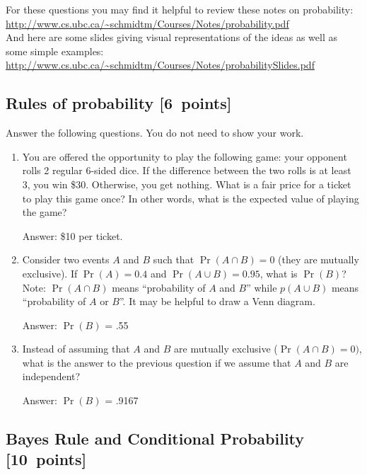 \documentclass{article}
\newcommand{\blu}[1]{{\textcolor{blu}{#1}}}
\newenvironment{answer}{\par\begingroup\color{gre}Answer: }{\endgroup}
\let\ask\blu
\newcommand\pts[1]{\textcolor{pointscolour}{[#1~points]}}
\begin{document}
  For these questions you may find it helpful to review these notes on probability:\\
  \url{http://www.cs.ubc.ca/~schmidtm/Courses/Notes/probability.pdf}\\
  And here are some slides giving visual representations of the ideas as well as some simple examples:\\
  \url{http://www.cs.ubc.ca/~schmidtm/Courses/Notes/probabilitySlides.pdf}

  \subsection{Rules of probability \pts{6}}

  \ask{Answer the following questions.} You do not need to show your work.

  \begin{enumerate}
  \item You are offered the opportunity to play the following game: your opponent rolls 2 regular 6-sided dice. If the difference between the two rolls is at least 3, you win \$30. Otherwise, you get nothing. What is a fair price for a ticket to play this game once? In other words, what is the expected value of playing the game?
  \begin{answer} 
    \$10 per ticket. 
  \end{answer}
  \item Consider two events $A$ and $B$ such that $\Pr(A \cap B)=0$ (they are mutually exclusive). If $\Pr(A) = 0.4$ and $\Pr(A \cup B) = 0.95$, what is $\Pr(B)$? Note: $\Pr(A \cap B)$ means
  ``probability of $A$ and $B$'' while $p(A \cup B)$ means ``probability of $A$ or $B$''. It may be helpful to draw a Venn diagram.
  \begin{answer} 
    $\Pr(B)$ = .55
  \end{answer}
  \item Instead of assuming that $A$ and $B$ are mutually exclusive ($\Pr(A \cap B) = 0)$, what is the answer to the previous question if we assume that $A$ and $B$ are independent?
  \begin{answer}
    $\Pr(B)$ = .9167
  \end{answer}

  \end{enumerate}

  \subsection{Bayes Rule and Conditional Probability \pts{10}}
\end{document}
